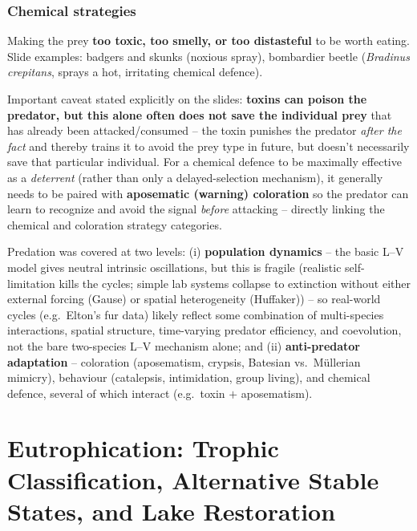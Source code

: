 \documentclass[11pt,a4paper]{article}
\begin{document}
\subsubsection*{Chemical strategies}
Making the prey \textbf{too toxic, too smelly, or too distasteful} to be worth eating. Slide examples: badgers and skunks (noxious spray), bombardier beetle (\textit{Bradinus crepitans}, sprays a hot, irritating chemical defence).

\begin{exambox}
Important caveat stated explicitly on the slides: \textbf{toxins can poison the predator, but this alone often does not save the individual prey} that has already been attacked/consumed -- the toxin punishes the predator \emph{after the fact} and thereby trains it to avoid the prey type in future, but doesn't necessarily save that particular individual. For a chemical defence to be maximally effective as a \emph{deterrent} (rather than only a delayed-selection mechanism), it generally needs to be paired with \textbf{aposematic (warning) coloration} so the predator can learn to recognize and avoid the signal \emph{before} attacking -- directly linking the chemical and coloration strategy categories.
\end{exambox}

\begin{keybox}[title=Topic summary]
Predation was covered at two levels: (i) \textbf{population dynamics} -- the basic L--V model gives neutral intrinsic oscillations, but this is fragile (realistic self-limitation kills the cycles; simple lab systems collapse to extinction without either external forcing (Gause) or spatial heterogeneity (Huffaker)) -- so real-world cycles (e.g.\ Elton's fur data) likely reflect some combination of multi-species interactions, spatial structure, time-varying predator efficiency, and coevolution, not the bare two-species L--V mechanism alone; and (ii) \textbf{anti-predator adaptation} -- coloration (aposematism, crypsis, Batesian vs.\ M\"ullerian mimicry), behaviour (catalepsis, intimidation, group living), and chemical defence, several of which interact (e.g.\ toxin $+$ aposematism).
\end{keybox}

\newpage

\section{Eutrophication: Trophic Classification, Alternative Stable States, and Lake Restoration}
\end{document}
